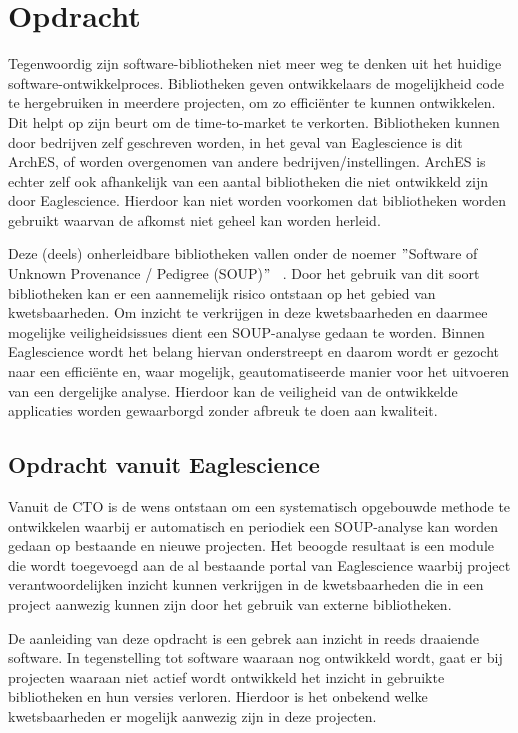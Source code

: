 
\chapter{Opdracht}\label{ch:opdracht} %
Tegenwoordig zijn software-bibliotheken niet meer weg te denken uit het huidige software-ontwikkelproces. Bibliotheken geven ontwikkelaars de mogelijkheid code te hergebruiken in meerdere projecten, om zo efficiënter te kunnen ontwikkelen. Dit helpt op zijn beurt om de time-to-market te verkorten. Bibliotheken kunnen door bedrijven zelf geschreven worden, in het geval van Eaglescience is dit ArchES, of worden overgenomen van andere bedrijven/instellingen. ArchES is echter zelf ook afhankelijk van een aantal bibliotheken die niet ontwikkeld zijn door Eaglescience. Hierdoor kan niet worden voorkomen dat bibliotheken worden gebruikt waarvan de afkomst niet geheel kan worden herleid.

Deze (deels) onherleidbare bibliotheken vallen onder de noemer $"$Software of Unknown Provenance / Pedigree (SOUP)$"$ ~\citep{Bischop:2001}. Door het gebruik van dit soort bibliotheken kan er een aannemelijk risico ontstaan op het gebied van kwetsbaarheden. Om inzicht te verkrijgen in deze kwetsbaarheden en daarmee mogelijke veiligheidsissues dient een SOUP-analyse gedaan te worden. Binnen Eaglescience wordt het belang hiervan onderstreept en daarom wordt er gezocht naar een efficiënte en, waar mogelijk, geautomatiseerde manier voor het uitvoeren van een dergelijke analyse. Hierdoor kan de veiligheid van de ontwikkelde applicaties worden gewaarborgd zonder afbreuk te doen aan kwaliteit.

\section{Opdracht vanuit Eaglescience}\label{sec:opdracht-vanuit-Eaglescience}

Vanuit de CTO is de wens ontstaan om een systematisch opgebouwde methode te ontwikkelen waarbij er automatisch en periodiek een SOUP-analyse kan worden gedaan op bestaande en nieuwe projecten. Het beoogde resultaat is een module die wordt toegevoegd aan de al bestaande portal van Eaglescience waarbij project verantwoordelijken inzicht kunnen verkrijgen in de kwetsbaarheden die in een project aanwezig kunnen zijn door het gebruik van externe bibliotheken.

De aanleiding van deze opdracht is een gebrek aan inzicht in reeds draaiende software. In tegenstelling tot software waaraan nog ontwikkeld wordt, gaat er bij projecten waaraan niet actief wordt ontwikkeld het inzicht in gebruikte bibliotheken en hun versies verloren. Hierdoor is het onbekend welke kwetsbaarheden er mogelijk aanwezig zijn in deze projecten.

